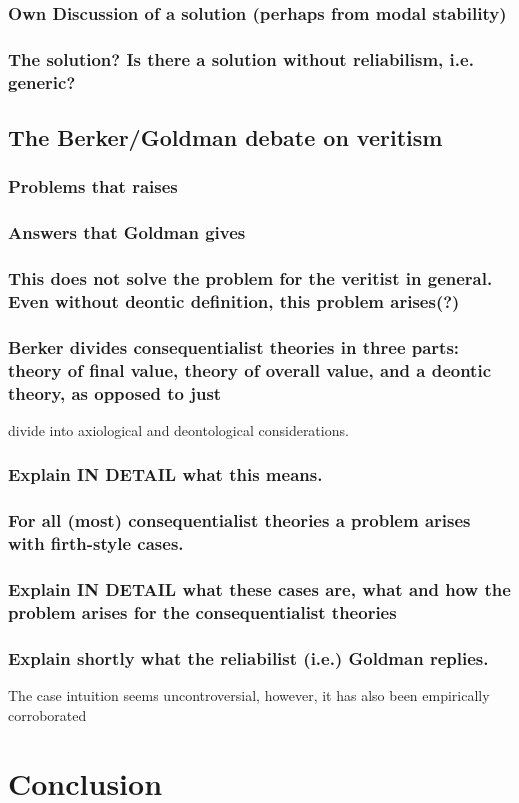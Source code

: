 \documentclass[12pt,numbers=noenddot]{scrartcl}
\begin{document}
\subsubsection{ Own Discussion of a solution (perhaps from modal stability)}
\subsubsection{ The solution? Is there a solution without reliabilism, i.e. generic?}
\subsection{The Berker/Goldman debate on veritism}

\subsubsection{ Problems that \textcite{Berker2013-BERETA-2} raises}
\subsubsection{ Answers that Goldman gives}
\subsubsection{ This does not solve the problem for the veritist in general. Even without deontic definition, this problem arises(?)}
\subsubsection{ Berker divides consequentialist theories in three parts: theory of final value, theory of overall value, and a deontic theory, as opposed to just }divide into axiological and deontological considerations. 
\subsubsection{ Explain IN DETAIL what this means. }
\subsubsection{ For all (most) consequentialist theories a problem arises with firth-style cases. }
\subsubsection{ Explain IN DETAIL what these cases are, what and how the problem arises for the consequentialist theories}
\subsubsection{ Explain shortly what the reliabilist (i.e.) Goldman replies.  }

The case intuition seems uncontroversial, however, it has also been empirically corroborated \textcite{Andow2016}
\section{Conclusion}


\printbibliography
\end{document}
